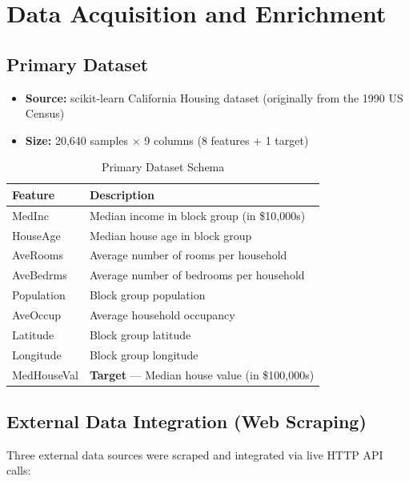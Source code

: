 \documentclass[12pt,a4paper]{article}
\begin{document}
\section{Data Acquisition and Enrichment}

\subsection{Primary Dataset}

\begin{itemize}
    \item \textbf{Source:} scikit-learn California Housing dataset (originally from the 1990 US Census)
    \item \textbf{Size:} 20,640 samples $\times$ 9 columns (8 features + 1 target)
\end{itemize}

\begin{table}[H]
\centering
\caption{Primary Dataset Schema}
\begin{tabular}{lp{9cm}}
\toprule
\textbf{Feature} & \textbf{Description} \\
\midrule
MedInc & Median income in block group (in \$10,000s) \\
HouseAge & Median house age in block group \\
AveRooms & Average number of rooms per household \\
AveBedrms & Average number of bedrooms per household \\
Population & Block group population \\
AveOccup & Average household occupancy \\
Latitude & Block group latitude \\
Longitude & Block group longitude \\
\midrule
MedHouseVal & \textbf{Target} --- Median house value (in \$100,000s) \\
\bottomrule
\end{tabular}
\end{table}

\subsection{External Data Integration (Web Scraping)}

Three external data sources were scraped and integrated via live HTTP API calls:
\end{document}
